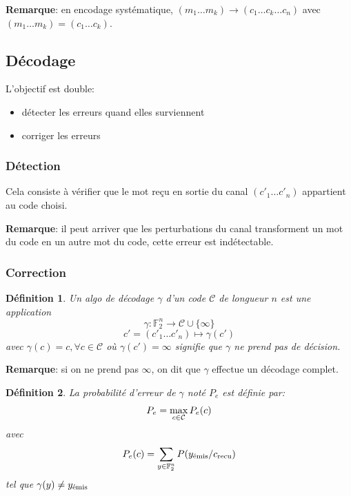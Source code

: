 \documentclass[a4paper,10pt,twocolumn]{article}
\theoremstyle{break}
\newtheorem{mydef}{Définition}
\newenvironment{note}[1]
{\textbf{#1}:}
{}
\newenvironment{remarque}
{\begin{note}{Remarque}}
{\end{note}}
\begin{document}
\begin{remarque}
 en encodage systématique, $(m_1 \ldots m_k) \rightarrow (c_1 \ldots c_k \ldots c_n)$ avec $(m_1 \ldots m_k) = (c_1 \ldots c_k)$.
\end{remarque}

\subsection{Décodage}
L'objectif est double:
\begin{itemize}
 \item détecter les erreurs quand elles surviennent 
 \item corriger les erreurs
\end{itemize}

\subsubsection{Détection}
Cela consiste à vérifier que le mot reçu en sortie du canal $(c'_1 \ldots c'_n)$ appartient au code choisi.

\begin{remarque}
 il peut arriver que les perturbations du canal transforment un mot du code en un autre mot du code, cette erreur est indétectable.
\end{remarque}

\subsubsection{Correction}
\begin{mydef}
 Un algo de décodage $\gamma$ d'un code $\mathcal{C}$ de longueur $n$ est une application
$$ \gamma: \mathbb{F}_2^n \rightarrow \mathcal{C} \cup \lbrace \infty \rbrace$$
$$ c' = (c'_1 \ldots c'_n) \mapsto \gamma(c')$$
avec $\gamma(c) = c, \forall c \in \mathcal{C}$ où $\gamma(c') = \infty$ signifie que $\gamma$ ne prend pas de décision.
\end{mydef}

\begin{remarque}
 si on ne prend pas $\infty$, on dit que $\gamma$ effectue un décodage complet.
\end{remarque}

\begin{mydef}
 La probabilité d'erreur de $\gamma$ noté $P_e$ est définie par:
 $$ P_e = \mathop{\rm max}_{c \in \mathcal{C}} P_e(c) $$
 avec 
 $$P_e(c) = \sum_{y \in \mathbb{F}_2^n} P(y_{\rm{\acute{e}mis}} / c_{\rm{recu}})$$
 tel que $ \gamma(y) \ne y_{\rm{\acute{e}mis}}$
\end{mydef}
\end{document}
